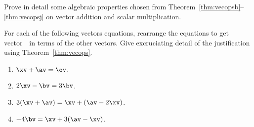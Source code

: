 \begin{exercise} \label{ex:} 
Prove in detail some algebraic properties chosen from Theorem~\ref{thm:vecopsb}--\ref{thm:vecopsj} on vector addition and scalar multiplication.
\end{exercise}




\begin{exercise} \label{ex:} 
For each of the following vectors equations, rearrange the equations to get vector~\xv\ in terms of the other vectors.  Give excruciating detail of the justification using Theorem~\ref{thm:vecops}.
\begin{enumerate}
\item \(\xv+\av=\ov\).
\item \(2\xv-\bv=3\bv\).
\item \(3(\xv+\av)=\xv+(\av-2\xv)\).
\item \(-4\bv=\xv+3(\av-\xv)\).
\end{enumerate}
\end{exercise}



\begin{comment}%
why, what caused X?
how did X occur?
what-if? what-if-not?
how does X compare with Y?
what is the evidence for X?
why is X important?
\end{comment}



